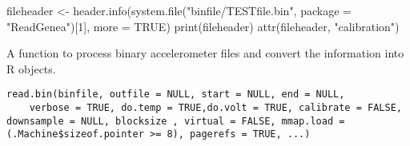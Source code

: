 \documentclass[a4paper]{book}
\begin{document}
%
\begin{Examples}
\begin{ExampleCode}

fileheader <- header.info(system.file("binfile/TESTfile.bin", package = "ReadGenea")[1], more = TRUE)
print(fileheader)
attr(fileheader, "calibration")
\end{ExampleCode}
\end{Examples}
%
\begin{Description}\relax
A function to process binary accelerometer files and convert the information into R objects.
\end{Description}
%
\begin{Usage}
\begin{verbatim}
read.bin(binfile, outfile = NULL, start = NULL, end = NULL, 
    verbose = TRUE, do.temp = TRUE,do.volt = TRUE, calibrate = FALSE, downsample = NULL, blocksize , virtual = FALSE, mmap.load = (.Machine$sizeof.pointer >= 8), pagerefs = TRUE, ...)
\end{verbatim}
\end{Usage}
%
\end{document}
